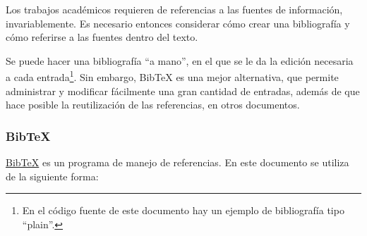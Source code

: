 Los trabajos académicos requieren de referencias a las fuentes de información, invariablemente. Es necesario entonces considerar cómo crear una bibliografía y cómo referirse a las fuentes dentro del texto. 

Se puede hacer una bibliografía ``a mano'', en el que se le da la edición necesaria a cada entrada\footnote{En el código fuente de este documento hay un ejemplo de bibliografía tipo ``plain''.}. Sin embargo, BibTeX es una mejor alternativa, que permite administrar y modificar fácilmente una gran cantidad de entradas, además de que hace posible la reutilización de las referencias, en otros documentos.

\subsubsection{BibTeX}

\href{http://www.bibtex.org/}{BibTeX} es un programa de manejo de referencias. En este documento se utiliza de la siguiente forma:


